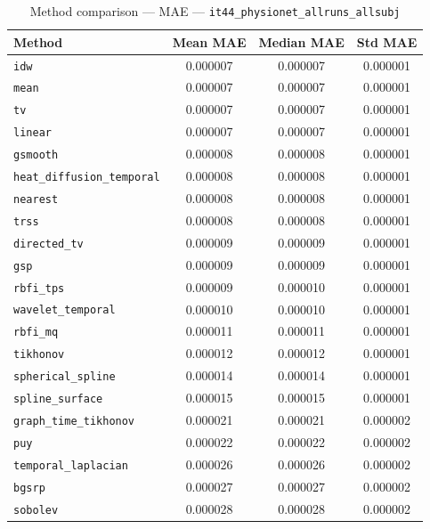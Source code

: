 \begin{table}[ht]
\centering
\caption{Method comparison — MAE — \texttt{it44_physionet_allruns_allsubj}}
\label{tab:mae_it44_physionet_allruns_allsubj}
\begin{tabular}{lccc}
\hline
Method & Mean MAE & Median MAE & Std MAE \\
\hline
\texttt{idw} & 0.000007 & 0.000007 & 0.000001 \\
\texttt{mean} & 0.000007 & 0.000007 & 0.000001 \\
\texttt{tv} & 0.000007 & 0.000007 & 0.000001 \\
\texttt{linear} & 0.000007 & 0.000007 & 0.000001 \\
\texttt{gsmooth} & 0.000008 & 0.000008 & 0.000001 \\
\texttt{heat_diffusion_temporal} & 0.000008 & 0.000008 & 0.000001 \\
\texttt{nearest} & 0.000008 & 0.000008 & 0.000001 \\
\texttt{trss} & 0.000008 & 0.000008 & 0.000001 \\
\texttt{directed_tv} & 0.000009 & 0.000009 & 0.000001 \\
\texttt{gsp} & 0.000009 & 0.000009 & 0.000001 \\
\texttt{rbfi_tps} & 0.000009 & 0.000010 & 0.000001 \\
\texttt{wavelet_temporal} & 0.000010 & 0.000010 & 0.000001 \\
\texttt{rbfi_mq} & 0.000011 & 0.000011 & 0.000001 \\
\texttt{tikhonov} & 0.000012 & 0.000012 & 0.000001 \\
\texttt{spherical_spline} & 0.000014 & 0.000014 & 0.000001 \\
\texttt{spline_surface} & 0.000015 & 0.000015 & 0.000001 \\
\texttt{graph_time_tikhonov} & 0.000021 & 0.000021 & 0.000002 \\
\texttt{puy} & 0.000022 & 0.000022 & 0.000002 \\
\texttt{temporal_laplacian} & 0.000026 & 0.000026 & 0.000002 \\
\texttt{bgsrp} & 0.000027 & 0.000027 & 0.000002 \\
\texttt{sobolev} & 0.000028 & 0.000028 & 0.000002 \\
\hline
\end{tabular}
\end{table}
